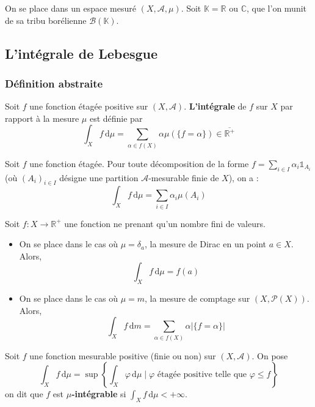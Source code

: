 



	On se place dans un espace mesuré $(X, \mathcal{A}, \mu)$. Soit $\mathbb{K} = \mathbb{R}$ ou $\mathbb{C}$, que l'on munit de sa tribu borélienne $\mathcal{B}(\mathbb{K})$.

	\subsection{L'intégrale de Lebesgue}

	\subsubsection{Définition abstraite}


	\begin{definition}
		Soit $f$ une fonction étagée positive sur $(X, \mathcal{A})$. \textbf{L'intégrale} de $f$ sur $X$ par rapport à la mesure $\mu$ est définie par
		\[ \int_X f \, \mathrm{d}\mu = \sum_{\alpha \in f(X)} \alpha \mu(\{ f = \alpha \}) \in \overline{\mathbb{R}^+} \]
	\end{definition}

	\begin{proposition}
		Soit $f$ une fonction étagée. Pour toute décomposition de la forme $f = \sum_{i \in I} \alpha_i \mathbb{1}_{A_i}$ (où $(A_i)_{i \in I}$ désigne une partition $\mathcal{A}$-mesurable finie de $X$), on a :
		\[ \int_X f \, \mathrm{d}\mu = \sum_{i \in I} \alpha_i \mu(A_i) \]
	\end{proposition}

	\begin{example}
		Soit $f : X \rightarrow \mathbb{R}^+$ une fonction ne prenant qu'un nombre fini de valeurs.
		\begin{itemize}
			\item On se place dans le cas où $\mu = \delta_a$, la mesure de Dirac en un point $a \in X$. Alors,
			\[ \int_X f \, \mathrm{d}\mu = f(a) \]
			\item On se place dans le cas où $\mu = m$, la mesure de comptage sur $(X, \mathcal{P}(X))$. Alors,
			\[ \int_X f \, \mathrm{d}m = \sum_{\alpha \in f(X)} \alpha |\{ f = \alpha \}| \]
		\end{itemize}
	\end{example}

	\begin{definition}
		Soit $f$ une fonction mesurable positive (finie ou non) sur $(X, \mathcal{A})$. On pose
		\[ \int_X f \, \mathrm{d}\mu = \sup \left\{ \int_X \varphi \, \mathrm{d}\mu \mid \varphi \text{ étagée positive telle que } \varphi \leq f \right\} \]
		on dit que $f$ est \textbf{$\mu$-intégrable} si $\int_X f \, \mathrm{d}\mu < +\infty$.
	\end{definition}


